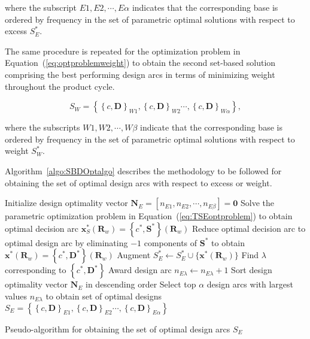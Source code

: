 where the subscript $E1,E2,\cdots,E\alpha$ indicates that the corresponding base is ordered by frequency in the set of parametric optimal solutions with respect to excess $S_E^*$.

The same procedure is repeated for the optimization problem in Equation~(\ref{eq:optproblemweight}) to obtain the second set-based solution comprising the best performing design arcs in terms of minimizing weight throughout the product cycle.

\begin{equation} \label{eq:SBDweight}
	S_W = \left\{\left\{c,\mathbf{D}\right\}_{W1},\left\{c,\mathbf{D}\right\}_{W2}\cdots,\left\{c,\mathbf{D}\right\}_{W\alpha}\right\},
\end{equation}

where the subscripts $W1,W2,\cdots,W\beta$ indicate that the corresponding base is ordered by frequency in the set of parametric optimal solutions with respect to weight $S_W^*$.

Algorithm~\ref{algo:SBDOptalgo} describes the methodology to be followed for obtaining the set of optimal design arcs with respect to excess or weight.

\begin{algorithm}
	\DontPrintSemicolon %
	Initialize design optimality vector $\mathbf{N}_E = \left[n_{E1},n_{E2},\cdots,n_{E\beta}\right] = \mathbf{0}$\;	
	 {
		Solve the parametric optimization problem in Equation~(\ref{eq:TSEoptproblem}) to obtain optimal decision arc $\mathbf{x}_S^*(\mathbf{R}_w) = \left\{c^*,\mathbf{S}^*\right\}(\mathbf{R}_w)$\;
		Reduce optimal decision arc to optimal design arc by eliminating $-1$ components of $\mathbf{S}^*$ to obtain $\mathbf{x}^*(\mathbf{R}_w) = \left\{c^*,\mathbf{D}^*\right\}(\mathbf{R}_w)$\;
		Augment $S_{E}^* \gets S_{E}^* \cup \{ \mathbf{x}^*(\mathbf{R}_w) \} $\;
		Find $\lambda$ corresponding to $\left\{c^*,\mathbf{D}^*\right\}$\;
		Award design arc $n_{E\lambda} \gets n_{E\lambda} + 1$\;
	}
	Sort design optimality vector $\mathbf{N}_E$ in descending order\;
	Select top $\alpha$ design arcs with largest values $n_{E\lambda}$ to obtain set of optimal designs $S_E = \left\{\left\{c,\mathbf{D}\right\}_{E1},\left\{c,\mathbf{D}\right\}_{E2}\cdots,\left\{c,\mathbf{D}\right\}_{E\alpha}\right\}$\;
	\caption{Pseudo-algorithm for obtaining the set of optimal design arcs $S_{E}$}
	\label{algo:SBDOptalgo}
\end{algorithm}

